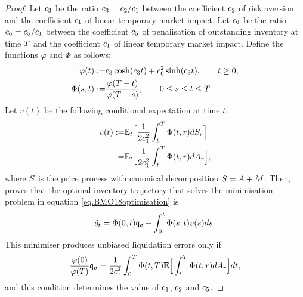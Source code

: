 \documentclass[10pt,a4paper]{article}
\begin{document}
\begin{proof}
Let $c_{3}$ be the ratio $c_{3}=c_{2}/c_{1}$ between the coefficient $c_{2}$ of risk aversion and the coefficient $c_{1}$ of linear temporary market impact. Let $c_{6}$ be the ratio $c_{6}=c_{5}/c_{1}$ between the coefficient $c_{5}$ of penalisation of outstanding inventory at time $T$  and the coefficient $c_{1}$ of linear temporary market impact. Define the functions $\varphi$ and $\Phi$ as follows:
\begin{equation}\label{eq.timeFunctionsInBMO18solution}
\begin{split}
\varphi(t) :=& c_{3} \cosh (c_{3} t) + c_{6}^{2}  \sinh(c_{3} t), \qquad t\geq 0, \\
\Phi(s,t) : = & \frac{\varphi(T - t)}{\varphi(T - s)} , \qquad 0\leq s \leq t \leq T.
\end{split}
\end{equation}
Let $v(t)$ be the following conditional expectation at time $t$:
\begin{equation}
\label{eq.conditionalExpectationInBMO18solution}
\begin{split}
v(t) :=& \mathbb{{E}}_t \Big[\frac{1}{2c_{1}^{2}}\int_{t}^{T} \Phi(t,r)dS_r \Big] \\
= & \mathbb{{E}}_t \Big[\frac{1}{2c_{1}^{2}}\int_{t}^{T} \Phi(t,r)dA_r \Big],
\end{split}
\end{equation}
where $S$ is the price process with canonical decomposition $S = A + M$. 
Then, \cite[Theorem 3.1]{BMO18opt} proves that the optimal inventory trajectory that solves the minimisation problem in equation \eqref{eq.BMO18optimisation} is 
\begin{equation}\label{eq.BMO18solution}
  \hat{q}_t = \Phi(0,t)\mathfrak{q_0} + \int_{0}^{t} \Phi(s,t)v(s) ds.
\end{equation}
This minimiser produces unbiased liquidation errors only if 
\begin{equation*}
\frac{\varphi(0)}{\varphi(T)}\mathfrak{q_0} 
= \frac{1}{2c_{1}^{2}} \int_{0}^{T} \Phi(t,T)\mathbb{{E}} \Big[\int_{t}^{T} \Phi(t,r)dA_r\Big]dt, 
\end{equation*}
and this condition determines the value of $c_{1}$, $c_{2}$ and $c_{5}$.   
\end{proof}
\end{document}
